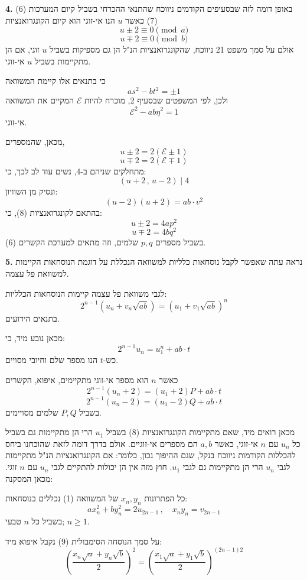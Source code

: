 \medskip
\noindent\textbf{4.} באופן דומה לזה שבסעיפים הקודמים ניווכח שהתנאי ההכרחי בשביל קיום המערכות (6)(7) כאשר $u$ הנו אי-זוגי הוא קיום הקונגרואנציות
\[ u \pm 2 \equiv 0 \pmod{a} \]
\[ u \mp 2 \equiv 0 \pmod{b} \tag{8} \]
אולם על סמך משפט 21 ניווכח, שהקונגרואנציות הנ"ל הן גם מספיקות בשביל $u$ זוגי, אם הן מתקיימות בשביל $u$ אי-זוגי.

\noindent כי בתנאים אלו קיימת המשוואה
\[ as^2 - bt^2 = \pm 1 \]
ולכן, לפי המשפטים שבסעיף 2, מוכרח להיות $\mathcal{E}$ המקיים את המשוואה
\[ \mathcal{E}^2 - ab\eta^2 = 1 \]
אי-זוגי.

\noindent מכאן, שהמספרים,
\[ u \pm 2 = 2(\mathcal{E}\pm1) \]
\[ u \mp 2 = 2(\mathcal{E}\mp1) \]
מתחלקים שניהם ב-4, נשים עוד לב לכך, כי:
\[ (u+2 \, , \, u-2) \mid 4 \]
ונסיק מן השוויון:
\[ (u-2)(u+2) = ab \cdot v^2 \]
בהתאם לקונגרואנציות (8), כי:
\[ u \pm 2 = 4ap^2 \]
\[ u \mp 2 = 4bq^2 \]
בשביל מספרים $p,q$ שלמים, וזה מתאים למערכת הקשרים (6).

\noindent\textbf{5.} נראה עתה שאפשר לקבל נוסחאות כלליות למשוואה הנכללת על דוגמת הנוסחאות הקיימות למשוואת פל עצמה.

\noindent לגבי משוואת פל עצמה קיימות הנוסחאות הכלליות:
\[ 2^{n-1}(u_n + v_n\sqrt{ab}) = (u_1 + v_1\sqrt{ab})^n \tag{9} \]
בתנאים הידועים.

\noindent מכאן נובע מיד, כי:
\[ 2^{n-1}u_n = u_1^n + ab \cdot t \]
כש-$t$ הנו מספר שלם וחיובי מסויים.

\noindent כאשר $n$ הוא מספר אי-זוגי מתקיימים, איפוא, הקשרים
\[ 2^{n-1}(u_n+2) = (u_1+2)P + ab \cdot t \]
\[ 2^{n-1}(u_n-2) = (u_1-2)Q + ab \cdot t \]
בשביל $P,Q$ שלמים מסויימים.

\noindent מכאן רואים מיד, שאם מתקיימות הקונגרואנציות (8) בשביל $u_1$ הרי הן מתקיימות גם בשביל כל $u_n$ עם $n$ אי-זוגי, כאשר $a,b$ הם מספרים אי-זוגיים. אולם בדרך דומה לזאת שהוכחנו ביחס להכללות הקודמות ניווכח בנקל, שגם ההיפוך נכון, כלומר: אם הקונגרואנציות הנ"ל מתקיימות לגבי $u_n$ הרי הן מתקיימות גם לגבי $u_1$. חוץ מזה אין הן יכולות להתקיים לגבי $u_n$ עם $n$ זוגי. מכאן המסקנה:

\noindent כל הפתרונות $x_n, y_n$ של המשוואה (1) נכללים בנוסחאות:
\[ ax_n^2 + by_n^2 = 2u_{2n-1} \, , \quad x_ny_n = v_{2n-1} \tag{10} \]
בשביל כל $n$ טבעי; $n \geq 1$.

\noindent על סמך הנוסחה הסימבולית (9) נקבל איפוא מיד:
\[ \left(\frac{x_n\sqrt{a} + y_n\sqrt{b}}{2}\right)^2 = \left(\frac{x_1\sqrt{a} + y_1\sqrt{b}}{2}\right)^{(2n-1)2} \]

